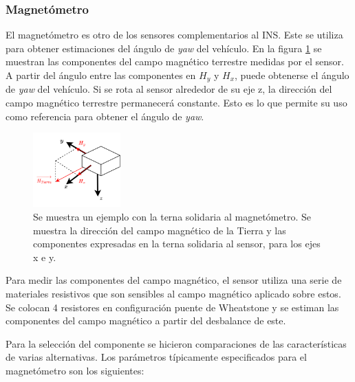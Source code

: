 \subsubsection{Magnetómetro}

El magnetómetro es otro de los sensores complementarios al INS. Este se utiliza para obtener estimaciones del ángulo de \textit{yaw} del vehículo. %
En la figura \ref{fig:magnetometro_H_tierra} se muestran las componentes del campo magnético terrestre medidas por el sensor. A partir del ángulo entre las componentes en $H_y$ y $H_x$, puede obtenerse el ángulo de \textit{yaw} del vehículo. Si se rota al sensor alrededor de su eje z, la dirección del campo magnético terrestre permanecerá constante. Esto es lo que permite su uso como referencia para obtener el ángulo de \textit{yaw}.


\begin{figure}[htb]
    \centering
    \includegraphics[width=0.3\textwidth]{img/magnetometro_H_tierra.png}
    \caption{Se muestra un ejemplo con la terna solidaria al magnetómetro. Se muestra la dirección del campo magnético de la Tierra y las componentes expresadas en la terna solidaria al sensor, para los ejes x e y.}
    \label{fig:magnetometro_H_tierra}
\end{figure}

Para medir las componentes del campo magnético, el sensor utiliza una serie de materiales resistivos que son sensibles al campo magnético aplicado sobre estos. Se colocan 4 resistores en configuración puente de Wheatstone y se estiman las componentes del campo magnético a partir del desbalance de este.

Para la selección del componente se hicieron comparaciones de las características de varias alternativas. Los parámetros típicamente especificados para el magnetómetro son los siguientes:

